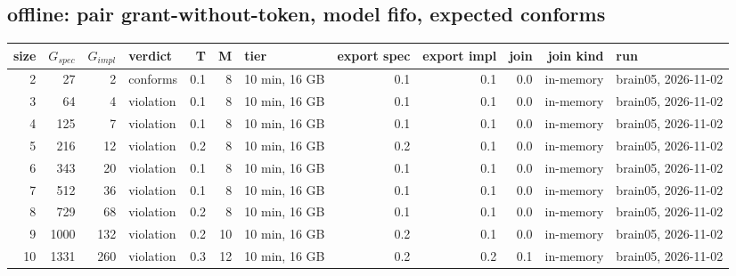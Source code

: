 \documentclass[10pt]{article}
\begin{document}
\subsection*{offline: pair \textsf{grant-without-token}, model fifo, expected conforms}
\begin{longtable}{@{}rrrlrrlrrrrl@{}}
\toprule
size & $G_{\mathit{spec}}$ & $G_{\mathit{impl}}$ & verdict & T & M & tier & export spec & export impl & join & join kind & run \\
\midrule
\endhead
\color{red} 2 & 27 & 2 & conforms & 0.1 & 8 & 10 min, 16 GB & 0.1 & 0.1 & 0.0 & in-memory & brain05, 2026-11-02 \\
\color{red} 3 & 64 & 4 & violation & 0.1 & 8 & 10 min, 16 GB & 0.1 & 0.1 & 0.0 & in-memory & brain05, 2026-11-02 \\
\color{red} 4 & 125 & 7 & violation & 0.1 & 8 & 10 min, 16 GB & 0.1 & 0.1 & 0.0 & in-memory & brain05, 2026-11-02 \\
\color{red} 5 & 216 & 12 & violation & 0.2 & 8 & 10 min, 16 GB & 0.2 & 0.1 & 0.0 & in-memory & brain05, 2026-11-02 \\
\color{red} 6 & 343 & 20 & violation & 0.1 & 8 & 10 min, 16 GB & 0.1 & 0.1 & 0.0 & in-memory & brain05, 2026-11-02 \\
\color{red} 7 & 512 & 36 & violation & 0.1 & 8 & 10 min, 16 GB & 0.1 & 0.1 & 0.0 & in-memory & brain05, 2026-11-02 \\
\color{red} 8 & 729 & 68 & violation & 0.2 & 8 & 10 min, 16 GB & 0.1 & 0.1 & 0.0 & in-memory & brain05, 2026-11-02 \\
\color{red} 9 & 1000 & 132 & violation & 0.2 & 10 & 10 min, 16 GB & 0.2 & 0.1 & 0.0 & in-memory & brain05, 2026-11-02 \\
\color{red} 10 & 1331 & 260 & violation & 0.3 & 12 & 10 min, 16 GB & 0.2 & 0.2 & 0.1 & in-memory & brain05, 2026-11-02 \\
\bottomrule
\end{longtable}
\end{document}
